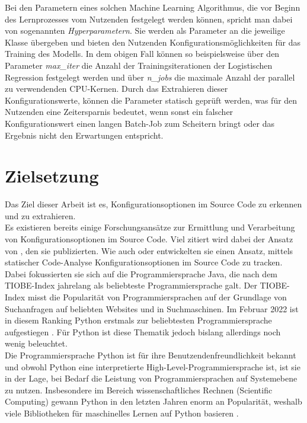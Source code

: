 \documentclass[german,bachelor]{swsLeipzig}
\begin{document}
Bei den Parametern eines solchen Machine Learning Algorithmus, die vor Beginn des Lernprozesses vom Nutzenden festgelegt werden können,
spricht man dabei von sogenannten \textit{Hyperparametern}.
Sie werden als Parameter an die jeweilige Klasse übergeben und bieten den Nutzenden Konfigurationsmöglichkeiten für
das Training des Modells.
In dem obigen Fall können so beispielsweise über den Parameter \textit{max\_iter} die Anzahl der Trainingsiterationen
der Logistischen Regression festgelegt werden und über \textit{n\_jobs} die maximale Anzahl der parallel zu verwendenden CPU-Kernen.
Durch das Extrahieren dieser Konfigurationswerte, können die Parameter statisch geprüft werden, was für den Nutzenden
eine Zeitersparnis bedeutet, wenn sonst ein falscher Konfigurationswert einen langen Batch-Job zum Scheitern bringt
oder das Ergebnis nicht den Erwartungen entspricht. \\



\section{Zielsetzung}
Das Ziel dieser Arbeit ist es, Konfigurationsoptionen im Source Code zu erkennen und zu extrahieren. \\

Es existieren bereits einige Forschungsansätze zur Ermittlung und Verarbeitung von Konfigurationsoptionen im Source Code.
Viel zitiert wird dabei der Ansatz von \citeauthor{10.1145/1985793.1985812}, den sie \citeyear{10.1145/1985793.1985812} publizierten.
Wie auch \citeauthor{7774519} oder \citeauthor{8049300} entwickelten sie einen Ansatz, mittels statischer Code-Analyse Konfigurationsoptionen
im Source Code zu tracken.
Dabei fokussierten sie sich auf die Programmiersprache Java, die nach dem TIOBE-Index jahrelang als beliebteste Programmiersprache galt.
Der TIOBE-Index misst die Popularität von Programmiersprachen auf der Grundlage von Suchanfragen auf beliebten Websites und in Suchmaschinen.
Im Februar 2022 ist in diesem Ranking Python erstmals zur beliebtesten Programmiersprache aufgestiegen \cite[]{enwiki:1077809155}.
Für Python ist diese Thematik jedoch bislang allerdings noch wenig beleuchtet. \\

Die Programmiersprache Python ist für ihre Benutzendenfreundlichkeit bekannt und obwohl Python eine interpretierte High-Level-Programmiersprache ist,
ist sie in der Lage, bei Bedarf die Leistung von Programmiersprachen auf Systemebene zu nutzen.
Insbesondere im Bereich wissenschaftliches Rechnen (Scientific Computing) gewann Python in den letzten Jahren enorm an Popularität,
weshalb viele Bibliotheken für maschinelles Lernen auf Python basieren \cite[]{2020}.\\
\end{document}
